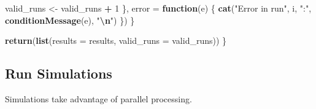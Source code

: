 \documentclass[
  letterpaper,
  DIV=11,
  numbers=noendperiod]{scrartcl}
\newenvironment{Shaded}{\begin{snugshade}}{\end{snugshade}}
\newcommand{\AttributeTok}[1]{\textcolor[rgb]{0.13,0.29,0.53}{#1}}
\newcommand{\ControlFlowTok}[1]{\textcolor[rgb]{0.13,0.29,0.53}{\textbf{#1}}}
\newcommand{\DecValTok}[1]{\textcolor[rgb]{0.00,0.00,0.81}{#1}}
\newcommand{\FunctionTok}[1]{\textcolor[rgb]{0.13,0.29,0.53}{\textbf{#1}}}
\newcommand{\NormalTok}[1]{#1}
\newcommand{\OtherTok}[1]{\textcolor[rgb]{0.56,0.35,0.01}{#1}}
\newcommand{\SpecialCharTok}[1]{\textcolor[rgb]{0.81,0.36,0.00}{\textbf{#1}}}
\newcommand{\StringTok}[1]{\textcolor[rgb]{0.31,0.60,0.02}{#1}}
\begin{document}
\begin{Shaded}
\begin{Highlighting}[]
\NormalTok{      valid\_runs }\OtherTok{\textless{}{-}}\NormalTok{ valid\_runs }\SpecialCharTok{+} \DecValTok{1}
\NormalTok{    \}, }\AttributeTok{error =} \ControlFlowTok{function}\NormalTok{(e) \{}
      \FunctionTok{cat}\NormalTok{(}\StringTok{"Error in run"}\NormalTok{, i, }\StringTok{":"}\NormalTok{, }\FunctionTok{conditionMessage}\NormalTok{(e), }\StringTok{"}\SpecialCharTok{\textbackslash{}n}\StringTok{"}\NormalTok{)}
\NormalTok{    \})}
\NormalTok{  \}}
  
  \FunctionTok{return}\NormalTok{(}\FunctionTok{list}\NormalTok{(}\AttributeTok{results =}\NormalTok{ results, }\AttributeTok{valid\_runs =}\NormalTok{ valid\_runs))}
\NormalTok{\}}
\end{Highlighting}
\end{Shaded}

\subsection{Run Simulations}\label{run-simulations}

Simulations take advantage of parallel processing.
\end{document}
